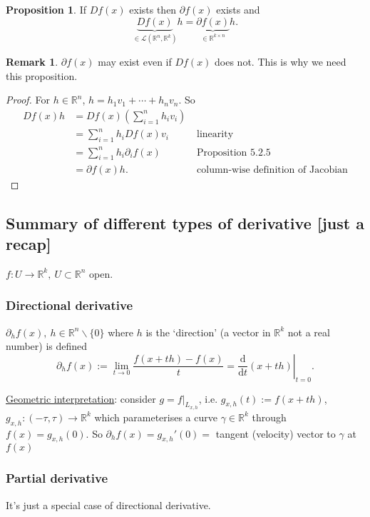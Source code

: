 \documentclass[a4paper]{article}
\theoremstyle{definition}
\newtheorem{prop}[defn]{Proposition}
\newtheorem*{remark}{Remark}
\begin{document}
\begin{prop}
If $Df(x)$ exists then $\partial f(x)$ exists and
\[
\underbrace{Df(x)}_{\in \mathcal L(\mathbb R^n,\mathbb R^k)}h=\underbrace{\partial f(x)}_{\in \mathbb R^{k\times n}} h .
\]
\end{prop}
\begin{remark}
$\partial f(x)$ may exist even if $Df(x)$ does not. This is why we need this proposition.
\end{remark}
\begin{proof}
For $h\in \mathbb R^n$, $h=h_1v_1+\cdots +h_n v_n$. So
\[
\begin{aligned}Df(x)h&=Df(x) \left(\sum_{i=1}^n h_i v_i\right)\\&=\sum_{i=1}^n h_i Df(x) v_i\qquad &\text{linearity} \\&= \sum_{i=1}^n h_i \partial_i f(x)\qquad &\text{Proposition 5.2.5} \\&= \partial f(x) h .\qquad &\text{column-wise definition of Jacobian}\end{aligned}
\]
\end{proof}

\subsection{Summary of different types of derivative [just a recap]}
$f:U\rightarrow \mathbb R^k,\ U\subset \mathbb R^n$ open.
\subsubsection{Directional derivative}
$\partial_h f(x),\ h\in \mathbb R^n \backslash \{0\}$ where $h$ is the `direction' (a vector in $\mathbb R^k$ not a real number) is defined
\[
\partial_h f(x) := \lim_{t\rightarrow 0}\frac{f(x+th)-f(x)}{t}=\left. \frac{\mathrm d}{\mathrm d t}(x+th) \right|_{t=0}.
\]

\underline{Geometric interpretation}: consider $g=\left.f\right|_{L_{x,h}}$, i.e. $g_{x,h}(t) := f(x+th)$, $g_{x,h}:(-\tau ,\tau) \rightarrow \mathbb R^k$ which parameterises a curve $\gamma \in \mathbb R^k$ through $f(x)=g_{x,h}(0)$. So $\partial_h f(x)=g_{x,h}' (0)=$ tangent (velocity) vector to $\gamma$ at $f(x)$

\subsubsection{Partial derivative}
It's just a special case of directional derivative.
\end{document}
